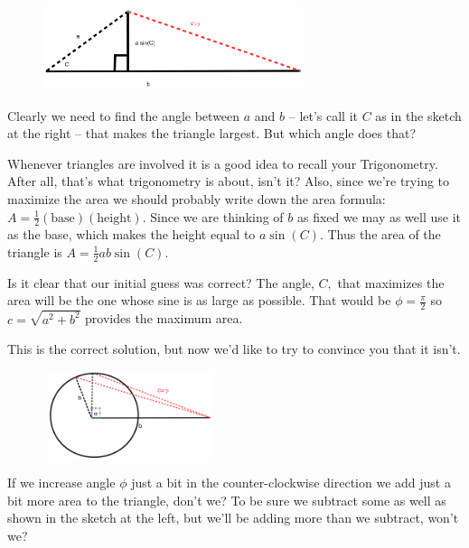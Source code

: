\begin{figure}
\captionsetup{labelformat=empty}
\centerline{\includegraphics*[height=1in,width=3in]{Figures/Advice4}}
\label{fig:Advice4}
\end{figure}
Clearly we need to find the angle between $a$ and $b$ -- let's call it
$C$ as in the sketch at the right -- that makes the triangle largest.
But which angle does that?

Whenever triangles are involved it is a good idea to recall your
Trigonometry. After all, that's what trigonometry is about, isn't it?
Also, since we're trying to maximize the area we should probably write
down the area formula: $A=\frac12(\text{base})(\text{height}).$ Since
we are thinking of $b$ as fixed we may as well use it as the base,
which makes the height equal to $a\sin(C).$ Thus the area of the
triangle is $A=\frac{1}{2}ab\sin(C).$


Is it clear that our initial guess was correct? The angle, $C,$ that
maximizes the area will be the one whose sine is as large as
possible. That would be $\phi=\frac{\pi}{2}$ so $c=\sqrt{a^2+b^2}$
provides the maximum area.

This is the correct solution, but now we'd like to try to convince you
that it isn't.

\begin{figure}
\captionsetup{labelformat=empty}
\centerline{\includegraphics*[height=1in,width=2in]{Figures/Advice5}}
\label{fig:Advice5}
\end{figure}
If we increase angle $\phi$ just a bit in the counter-clockwise direction
we add just a bit more area to the triangle, don't we? To be sure we
subtract some as well as shown in the sketch at the left, but we'll be
adding more than we subtract, won't we?


